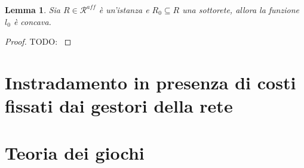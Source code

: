 \documentclass[a4paper]{article}
\newcounter{counter1}
\theoremstyle{plain}
\newtheorem{mylem}[counter1]{Lemma}
\theoremstyle{definition}
\theoremstyle{remark}
\begin{document}
\begin{mylem}
  Sia $R\in \mathcal{R}^{aff}$ è un'istanza e $R_0\subseteq R$ una
  sottorete, allora la funzione $l_0$ è concava.
\end{mylem}
\begin{proof}
  TODO: \cite[Lemma 3.11]{menache2011network}
\end{proof}



\section{Instradamento in presenza di costi fissati dai gestori della rete}

\appendix

\section{Teoria dei giochi}
\label{sec:teoria-giochi}

\cite{menache2011network}




\end{document}
